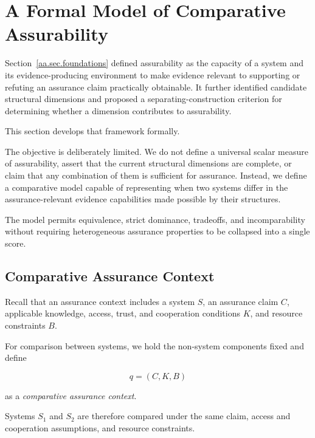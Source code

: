 \section{A Formal Model of Comparative Assurability}
\label{aa.sec.formal-model}

Section~\ref{aa.sec.foundations} defined assurability as the capacity of a system and its evidence-producing environment
to make evidence relevant to supporting or refuting an assurance claim practically obtainable.
It further identified candidate structural dimensions and proposed a separating-construction criterion for determining whether a dimension contributes to assurability.

This section develops that framework formally.

The objective is deliberately limited.
We do not define a universal scalar measure of assurability, assert that the current
structural dimensions are complete, or claim that any combination of them is sufficient for assurance.
Instead, we define a comparative model capable of representing when two systems differ in the assurance-relevant evidence capabilities made possible by their structures.

The model permits equivalence, strict dominance, tradeoffs, and incomparability without
requiring heterogeneous assurance properties to be collapsed into a single score.

\subsection{Comparative Assurance Context}
\label{aa.subsec.formal-context}

Recall that an assurance context includes a system \(S\), an assurance claim \(C\),
applicable knowledge, access, trust, and cooperation conditions \(K\), and resource constraints \(B\).

For comparison between systems, we hold the non-system components fixed and define

\begin{equation}
  q=(C,K,B)
  \label{eq:comparative-context}
\end{equation}

as a \emph{comparative assurance context}.

Systems \(S_1\) and \(S_2\) are therefore compared under the same claim, access and
cooperation assumptions, and resource constraints.

